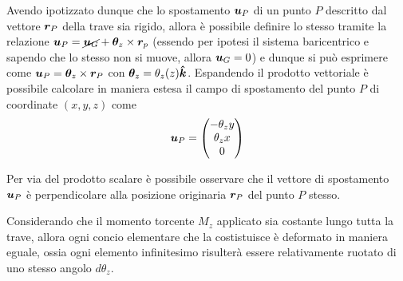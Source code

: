 		Avendo ipotizzato dunque che lo spostamento $\boldsymbol{u}_P$ di un punto $P$ descritto dal vettore $\boldsymbol{r}_P$ della trave sia rigido, allora è possibile definire lo stesso tramite la relazione $\boldsymbol{u}_P = \cancel{\boldsymbol{u}_G} + \boldsymbol{\theta}_z \times \boldsymbol{r}_p$ (essendo per ipotesi il sistema baricentrico e sapendo che lo stesso non si muove, allora $\boldsymbol{u}_G = 0$) e dunque si può esprimere come $\boldsymbol{u}_P = \boldsymbol{\theta}_z \times \boldsymbol{r}_P$ con $\boldsymbol{\theta}_z = \theta_z(z) \boldsymbol{\hat{k}}$. Espandendo il prodotto vettoriale è possibile calcolare in maniera estesa il campo di spostamento del punto $P$ di coordinate $(x,y,z)$ come
		\[ \boldsymbol{u}_P = \begin{pmatrix}
			-\theta_z y \\ \theta_z x \\ 0
		\end{pmatrix} \]
    	\begin{nota}
    	    Per via del prodotto scalare è possibile osservare che il vettore di spostamento $\boldsymbol{u}_P$ è perpendicolare alla posizione originaria $\boldsymbol{r}_P$ del punto $P$ stesso.
    	\end{nota}
    	
    	Considerando che il momento torcente $M_z$ applicato sia costante lungo tutta la trave, allora ogni concio elementare che la costistuisce è deformato in maniera eguale, ossia ogni elemento infinitesimo risulterà essere relativamente ruotato di uno stesso angolo $d\theta_z$.
    	
